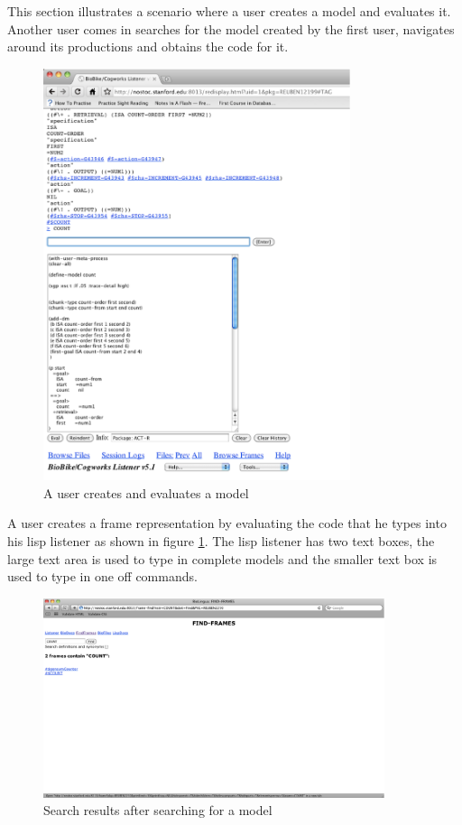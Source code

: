 This section illustrates a scenario where a user creates a model and
evaluates it. Another user comes in searches for the model created by
the first user, navigates around its productions and obtains the code for
it. 

\begin{figure}[htp]
  \centering
  \includegraphics[width=90mm]{UserCreatesModel}
  \caption{A user creates and evaluates a model}
  \label{UserCreatesModel}
\end{figure}

A user creates a frame representation by evaluating the code that he
types into his lisp listener as shown in figure
\ref{UserCreatesModel}. The lisp listener has two text boxes, the
large text area is used to type in complete models and the smaller
text box is used to type in one off commands.

\begin{figure}[htp]
  \centering
  \includegraphics[width=100mm]{SearchForModel}
  \caption{Search results after searching for a model}
  \label{SearchForModel}
\end{figure}

